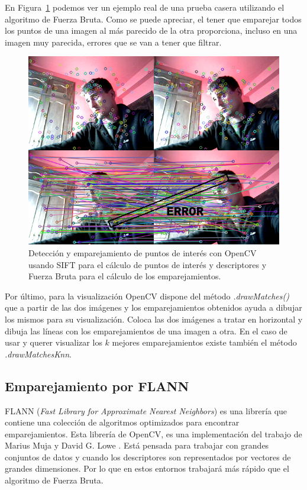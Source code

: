 En Figura~\ref{fig:SiftDetector} podemos ver un ejemplo real de una prueba casera utilizando el algoritmo de Fuerza Bruta. Como se puede apreciar, el tener que emparejar todos los puntos de una imagen al más parecido de la otra proporciona, incluso en una imagen muy parecida, errores que se van a tener que filtrar.

\begin{figure}[th]
\centering
\includegraphics[scale=0.8]{Figures/sift-detector.png}
\decoRule
\caption[Captura real con SIFT]{Detección y emparejamiento de puntos de interés con OpenCV usando SIFT para el cálculo de puntos de interés y descriptores y Fuerza Bruta para el cálculo de los emparejamientos.}
\label{fig:SiftDetector}
\end{figure}



Por último, para la visualización OpenCV dispone del método \textit{.drawMatches()} que a partir de las dos imágenes y los emparejamientos obtenidos ayuda a dibujar los mismos para su visualización. Coloca las dos imágenes a tratar en horizontal y dibuja las líneas con los emparejamientos de una imagen a otra. En el caso de usar y querer visualizar los $k$ mejores emparejamientos existe también el método \textit{.drawMatchesKnn}.


\subsection{Emparejamiento por FLANN}

FLANN (\textit{Fast Library for Approximate Nearest Neighbors}) es una librería que contiene una colección de algoritmos optimizados para encontrar emparejamientos. Esta librería de OpenCV, es una implementación del trabajo de Marius Muja y David G. Lowe \parencite{Reference11}. Está pensada para trabajar con grandes conjuntos de datos y cuando los descriptores son representados por vectores de grandes dimensiones. Por lo que en estos entornos trabajará más rápido que el algoritmo de Fuerza Bruta.

